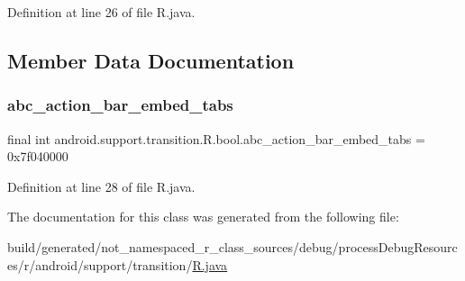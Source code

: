 Definition at line 26 of file R.\+java.


\begin{DoxyCode}{0}

\end{DoxyCode}


\subsection{Member Data Documentation}
\mbox{\label{classandroid_1_1support_1_1transition_1_1_r_1_1bool_a84b992ac7b4ad5bd9328f8b255a3b363}} 
\subsubsection{\texorpdfstring{abc\_action\_bar\_embed\_tabs}{abc\_action\_bar\_embed\_tabs}}
{\footnotesize\ttfamily final int android.\+support.\+transition.\+R.\+bool.\+abc\+\_\+action\+\_\+bar\+\_\+embed\+\_\+tabs = 0x7f040000\hspace{0.3cm}{\ttfamily [static]}}



Definition at line 28 of file R.\+java.



The documentation for this class was generated from the following file\+:\begin{DoxyCompactItemize}
\item 
build/generated/not\+\_\+namespaced\+\_\+r\+\_\+class\+\_\+sources/debug/process\+Debug\+Resources/r/android/support/transition/\mbox{\hyperlink{android_2support_2transition_2_r_8java}{R.\+java}}\end{DoxyCompactItemize}
